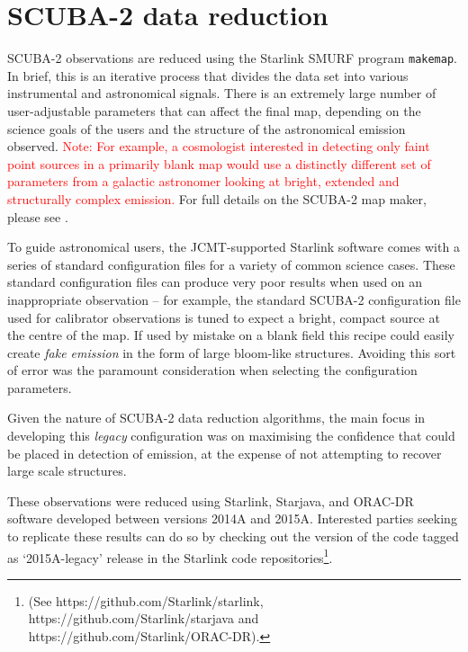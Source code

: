 \documentclass[twocolumn,times]{aastex6}
\newcommand{\note}[1]{\textcolor{red}{Note: #1}}
\begin{document}
\section{SCUBA-2 data reduction}
\label{sec:dr}
SCUBA-2 observations are reduced using the Starlink SMURF program
\texttt{makemap}. In brief, this is an iterative process that divides
the data set into various instrumental and astronomical signals. There
is an extremely large number of user-adjustable parameters that can
affect the final map, depending on the science goals of the users and
the structure of the astronomical emission observed. \note{For example, a
cosmologist interested in detecting only faint point sources in a
primarily blank map would use a distinctly different set of parameters
from a galactic astronomer looking at bright, extended and
structurally complex emission.} For full details on the SCUBA-2 map
maker, please see \citet{Chapin2013}.


To guide astronomical users, the JCMT-supported Starlink software
comes with a series of standard configuration files for a variety of
common science cases.
These standard configuration files can produce very poor results when
used on an inappropriate observation -- for example, the standard
SCUBA-2 configuration file used for calibrator observations is tuned
to expect a bright, compact source at the centre of the map. If used
by mistake on a blank field this recipe could easily create \emph{fake
  emission} in the form of large bloom-like structures. Avoiding this
sort of error was the paramount consideration when selecting the
configuration parameters.

Given the nature of SCUBA-2 data reduction algorithms, the main focus
in developing this \emph{legacy} configuration was on maximising the
confidence that could be placed in detection of emission, at the
expense of not attempting to recover large scale structures.

These observations were reduced using Starlink, Starjava, and ORAC-DR
software developed between versions 2014A and 2015A. Interested
parties seeking to replicate these results can do so by checking out
the version of the code tagged as `2015A-legacy' release in the
Starlink code repositories\footnote{(See
  https://github.com/Starlink/starlink,
  https://github.com/Starlink/starjava and
  https://github.com/Starlink/ORAC-DR).}.
\end{document}
